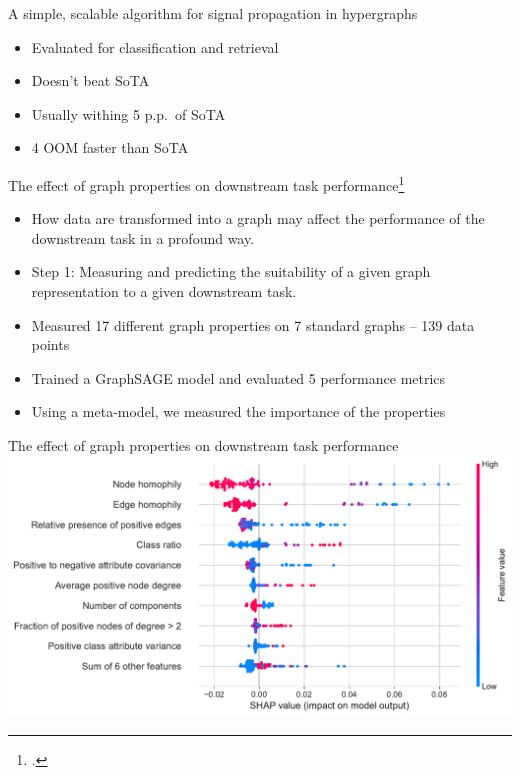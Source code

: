 \documentclass[10pt]{beamer}
\begin{document}
\begin{frame}{A simple, scalable algorithm for signal propagation in hypergraphs}
	\begin{itemize}
		\item<1-> Evaluated for classification and retrieval
		\item<2-> Doesn't beat SoTA
		\item<3-> Usually withing 5 p.p.\ of SoTA
		\item<4-> 4 OOM faster than SoTA
	\end{itemize}
\end{frame}

\begin{frame}{The effect of graph properties on downstream task performance\footcite{prochazka_which_2023}}
	\begin{itemize}
		\item<1-> How data are transformed into a graph may affect the performance of the downstream task in a profound way.
		\item<2-> Step 1: Measuring and predicting the suitability of a given graph representation to a given downstream task.
		\item<3-> Measured 17 different graph properties on 7 standard graphs -- 139 data points
		\item<4-> Trained a GraphSAGE model and evaluated 5 performance metrics
		\item<5-> Using a meta-model, we measured the importance of the properties
	\end{itemize}
\end{frame}

\begin{frame}{The effect of graph properties on downstream task performance}
	\includegraphics[width=\linewidth]{images/graph-property-importance.pdf}
\end{frame}
\end{document}

